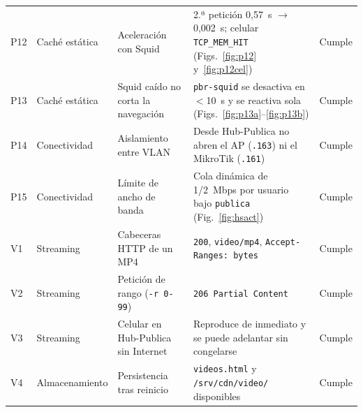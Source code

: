 \documentclass[conference]{IEEEtran}
\begin{document}
\begin{table}[!t]
\begin{tabularx}{\textwidth}{lP{2.1cm}P{4.2cm}Yl}
P12 & Caché estática & Aceleración con Squid & 2.ª petición 0,57~s $\rightarrow$ 0,002~s; celular \texttt{TCP\_MEM\_HIT} (Figs.~\ref{fig:p12} y~\ref{fig:p12cel}) & Cumple \\
P13 & Caché estática & Squid caído no corta la navegación & \texttt{pbr-squid} se desactiva en $<$10~s y se reactiva sola (Figs.~\ref{fig:p13a}--\ref{fig:p13b}) & Cumple \\
P14 & Conectividad & Aislamiento entre VLAN & Desde Hub-Publica no abren el AP (\texttt{.163}) ni el MikroTik (\texttt{.161}) & Cumple \\
P15 & Conectividad & Límite de ancho de banda & Cola dinámica de 1/2~Mbps por usuario bajo \texttt{publica} (Fig.~\ref{fig:hsact}) & Cumple \\
\midrule
V1 & Streaming & Cabeceras HTTP de un MP4 & \texttt{200}, \texttt{video/mp4}, \texttt{Accept-Ranges: bytes} & Cumple \\
V2 & Streaming & Petición de rango (\texttt{-r 0-99}) & \texttt{206 Partial Content} & Cumple \\
V3 & Streaming & Celular en Hub-Publica sin Internet & Reproduce de inmediato y se puede adelantar sin congelarse & Cumple \\
V4 & Almacenamiento & Persistencia tras reinicio & \texttt{videos.html} y \texttt{/srv/cdn/video/} disponibles & Cumple \\
\bottomrule
\end{tabularx}
\end{table}
\end{document}
